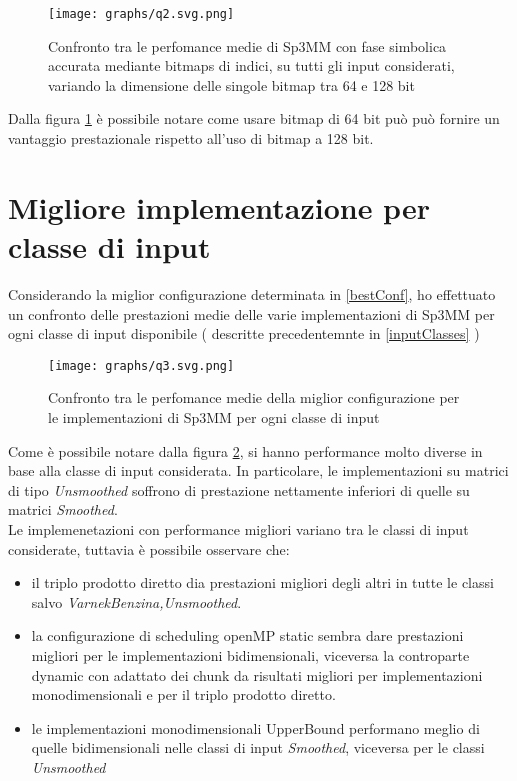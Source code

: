\begin{figure}[H]
  \centering \texttt{[image: graphs/q2.svg.png]}
  \caption{Confronto tra le perfomance medie di Sp3MM con fase simbolica accurata mediante bitmaps di indici,
		   su tutti gli input considerati, variando la dimensione delle singole bitmap tra 64 e 128 bit}
  \decoRule \label{fig:q2}
\end{figure}
Dalla figura \ref{fig:q2} è possibile notare come usare bitmap di 64 bit può può fornire un vantaggio prestazionale
rispetto all'uso di bitmap a 128 bit.

\section{Migliore implementazione per classe di input} \label{chPerf:q3}
Considerando la miglior configurazione determinata in \ref{bestConf}, ho effettuato un confronto delle prestazioni medie
delle varie implementazioni di Sp3MM per ogni classe di input disponibile ( descritte precedentemnte in \ref{inputClasses} )
\begin{figure}[H]	
  \centering \texttt{[image: graphs/q3.svg.png]}
  \caption{Confronto tra le perfomance medie della miglior configurazione per le implementazioni di Sp3MM per ogni classe di input}
  \label{fig:q3}
\end{figure}
Come è possibile notare dalla figura \ref{fig:q3}, si hanno performance molto diverse in base alla classe di input considerata.
In particolare, le implementazioni su matrici di tipo \emph{Unsmoothed} soffrono di prestazione nettamente inferiori di quelle 
su matrici \emph{Smoothed}.\\
Le implemenetazioni con performance migliori variano tra le classi di input considerate, tuttavia è possibile osservare che:
\begin{itemize}		\label{chPerf:inClassPerfOss}
	\item il triplo prodotto diretto dia prestazioni migliori degli altri in tutte le classi salvo \emph{VarnekBenzina,Unsmoothed}.
	\item la configurazione di scheduling openMP static sembra dare prestazioni migliori per le implementazioni bidimensionali,
		  viceversa la controparte dynamic con adattato dei chunk da risultati migliori per implementazioni monodimensionali e per il triplo prodotto diretto.
	\item le implementazioni monodimensionali UpperBound performano meglio di quelle bidimensionali nelle classi di input \emph{Smoothed},
		  viceversa per le classi \emph{Unsmoothed}
\end{itemize}

